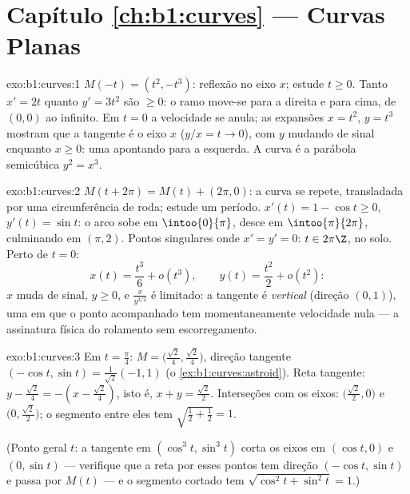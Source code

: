 \section*{Capítulo \ref{ch:b1:curves} --- Curvas Planas}

\begin{solution}{exo:b1:curves:1}
$M(-t) = (t^2, -t^3)$: reflexão no eixo $x$; estude $t \geq 0$. Tanto $x' = 2t$ quanto
$y' = 3t^2$ são $\geq 0$: o ramo move-se para a direita e para cima, de
$(0,0)$ ao infinito. Em $t = 0$ a velocidade se anula; as expansões
$x = t^2$, $y = t^3$ mostram que a tangente é o eixo $x$ ($y/x = t \to 0$), com
$y$ mudando de sinal enquanto $x \geq 0$: uma \emph{} apontando
para a esquerda. A curva é a parábola semicúbica $y^2 = x^3$.
\end{solution}

\begin{solution}{exo:b1:curves:2}
$M(t + 2\pi) = M(t) + (2\pi, 0)$: a curva se repete, transladada por uma circunferência de roda;
estude um período. $x'(t) = 1 - \cos t \geq
0$, $y'(t) = \sin t$: o arco sobe em $\intoo{0}{\pi}$, desce em
$\intoo{\pi}{2\pi}$, culminando em $(\pi, 2)$. Pontos singulares onde $x' = y' = 0$: $t \in 2\pi\Z$, no
solo. Perto de $t = 0$:
\[
x(t) = \frac{t^3}{6} + o(t^3),
\qquad
y(t) = \frac{t^2}{2} + o(t^2):
\]
$x$ muda de sinal, $y \geq 0$, e $\frac{x}{y^{3/2}}$ é limitado: a tangente é
\emph{vertical} (direção $(0,1)$), uma  em que o ponto
acompanhado tem momentaneamente velocidade nula --- a assinatura
física do rolamento sem escorregamento.
\end{solution}

\begin{solution}{exo:b1:curves:3}
Em $t = \frac\pi4$: $M = \bigl(\frac{\sqrt2}{4},
\frac{\sqrt2}{4}\bigr)$, direção tangente $(-\cos t, \sin t) =
\frac{1}{\sqrt2}(-1, 1)$ (o \cref{ex:b1:curves:astroid}). Reta tangente:
$y - \frac{\sqrt2}{4} = -(x - \frac{\sqrt2}{4})$, isto é, $x +
y = \frac{\sqrt2}{2}$. Interseções com os eixos: $\bigl(\frac{\sqrt2}{2},
0\bigr)$ e $\bigl(0, \frac{\sqrt2}{2}\bigr)$; o
segmento entre eles tem  $\sqrt{\frac12 + \frac12} = 1$.

(Ponto geral $t$: a tangente em $(\cos^3 t, \sin^3 t)$ corta os eixos em $(\cos t, 0)$ e $(0, \sin t)$
--- verifique que a reta por esses pontos tem direção $(-\cos t, \sin t)$ e passa
por $M(t)$ --- e o segmento cortado tem  $\sqrt{\cos^2 t +
\sin^2 t} = 1$.)
\end{solution}

